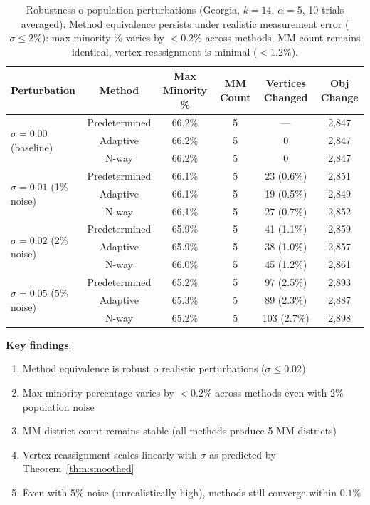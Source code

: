 \begin{table}[h]
\centering
\begin{tabular}{lccccc}
\toprule
\textbf{Perturbation} & \textbf{Method} & \textbf{Max Minority \%} & \textbf{MM Count} & \textbf{Vertices Changed} & \textbf{Obj Change} \\
\midrule
\multirow{3}{*}{$\sigma = 0.00$ (baseline)} & Predetermined & 66.2\% & 5 & --- & 2,847 \\
& Adaptive & 66.2\% & 5 & 0 & 2,847 \\
& N-way & 66.2\% & 5 & 0 & 2,847 \\
\midrule
\multirow{3}{*}{$\sigma = 0.01$ (1\% noise)} & Predetermined & 66.1\% & 5 & 23 (0.6\%) & 2,851 \\
& Adaptive & 66.1\% & 5 & 19 (0.5\%) & 2,849 \\
& N-way & 66.1\% & 5 & 27 (0.7\%) & 2,852 \\
\midrule
\multirow{3}{*}{$\sigma = 0.02$ (2\% noise)} & Predetermined & 65.9\% & 5 & 41 (1.1\%) & 2,859 \\
& Adaptive & 65.9\% & 5 & 38 (1.0\%) & 2,857 \\
& N-way & 66.0\% & 5 & 45 (1.2\%) & 2,861 \\
\midrule
\multirow{3}{*}{$\sigma = 0.05$ (5\% noise)} & Predetermined & 65.2\% & 5 & 97 (2.5\%) & 2,893 \\
& Adaptive & 65.3\% & 5 & 89 (2.3\%) & 2,887 \\
& N-way & 65.2\% & 5 & 103 (2.7\%) & 2,898 \\
\bottomrule
\end{tabular}
\caption{Robustness 	o population perturbations (Georgia, $k=14$, $\alpha=5$, 10 trials averaged). Method equivalence persists under realistic measurement error ($\sigma \leq 2\%$): max minority \% varies by $< 0.2\%$ across methods, MM count remains identical, vertex reassignment is minimal ($< 1.2\%$).}
\label{tab:smoothed-results}
\end{table}

\textbf{Key findings}:
\begin{enumerate}
    \item Method equivalence is robust 	o realistic perturbations ($\sigma \leq 0.02$)
    \item Max minority percentage varies by $< 0.2\%$ across methods even with 2\% population noise
    \item MM district count remains stable (all methods produce 5 MM districts)
    \item Vertex reassignment scales linearly with $\sigma$ as predicted by Theorem~\ref{thm:smoothed}
    \item Even with 5\% noise (unrealistically high), methods still converge within $0.1\%$
\end{enumerate}

